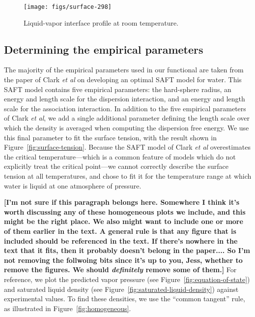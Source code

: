 \documentclass[letterpaper,twocolumn,amsmath,amssymb,prb]{revtex4-1}
\newcommand{\red}[1]{{\bf \color{red} #1}}
\newcommand{\fixme}[1]{\red{[#1]}}
\begin{document}
\begin{figure}
\begin{center}
\texttt{[image: figs/surface-298]}
\end{center}
\caption{Liquid-vapor interface profile at room temperature.  }
\label{fig:liquid-vapor-profile}
\end{figure}

\subsection{Determining the empirical parameters}\label{sec:empirical}

The majority of the empirical parameters used in our functional are
taken from the paper of Clark \emph{et al} on developing an optimal
SAFT model for water\cite{clark2006developing}.  This SAFT model
contains five empirical parameters: the hard-sphere radius, an energy
and length scale for the dispersion interaction, and an energy and
length scale for the association interaction.  In addition to the five
empirical parameters of Clark \emph{et al}, we add a single additional
parameter defining the length scale over which the density is averaged
when computing the dispersion free energy.  We use this final
parameter to fit the surface tension, with the result shown in
Figure~\ref{fig:surface-tension}.  Because the SAFT model of Clark
\emph{et al} overestimates the critical temperature---which is a
common feature of models which do not explicitly treat the critical
point---we cannot correctly describe the surface tension at all
temperatures, and chose to fit it for the temperature range at which
water is liquid at one atmosphere of pressure.

\fixme{I'm not sure if this paragraph belongs here.  Somewhere I think
  it's worth discussing any of these homogeneous plots we include, and
  this might be the right place.  We also might want to include one or
  more of them earlier in the text.  A general rule is that any figure
  that is included should be referenced in the text.  If there's
  nowhere in the text that it fits, then it probably doesn't belong in
  the paper....  So I'm not removing the follwoing bits since it's up
  to you, Jess, whether to remove the figures.  We should
  \emph{definitely} remove some of them.}  For reference, we plot the
predicted vapor pressure (see Figure~\ref{fig:equation-of-state}) and
saturated liquid density (see
Figure~\ref{fig:saturated-liquid-density}) against experimental
values.  To find these densities, we use the ``common tangent'' rule,
as illustrated in Figure~\ref{fig:homogeneous}.
\end{document}
